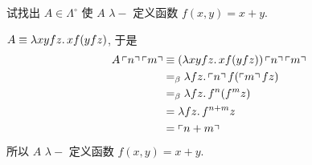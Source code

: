 \begin{problem}
试找出 $A \in \Lambda^\circ$ 使 $A$ $\lambda-$ 定义函数 $f(x,y)=x+y$.
\end{problem}

\begin{solution}
$A \equiv \lambda {xyfz}.\,{xf(yfz)}$, 于是
\begin{align*}
A \left\ulcorner n \right\urcorner \left\ulcorner m \right\urcorner & \equiv (\lambda {xyfz}.\,{xf(yfz)}) \left\ulcorner n \right\urcorner \left\ulcorner m \right\urcorner \\
& =_\beta \lambda {fz}.\,{\left\ulcorner n \right\urcorner f(\left\ulcorner m \right\urcorner fz)} \\
& =_\beta \lambda {fz}.\,{f^n(f^m z)} \\
& = \lambda {fz}.\,{f^{n+m}z} \\
& = \left\ulcorner n+m \right\urcorner
\end{align*}
所以 $A$ $\lambda-$ 定义函数 $f(x,y)=x+y$.
\end{solution}
